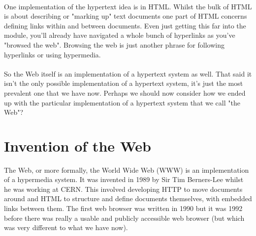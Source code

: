 \documentclass[12pt, a4paper, oneside]{book}
\begin{document}
\paragraph{} One implementation of the hypertext idea is in HTML.  Whilst the bulk of HTML is about describing or "marking up" text documents one part of HTML concerns defining links within and between documents. Even just getting this far into the module, you'll already have navigated a whole bunch of hyperlinks as you've "browsed the web". Browsing the web is just another phrase for following hyperlinks or using hypermedia. 
\paragraph{} So the Web itself is an implementation of a hypertext system as well. That said it isn't the only possible implementation of a hypertext system, it's just the most prevalent one that we have now. Perhaps we should now consider how we ended up with the particular implementation of a hypertext system that we call "the Web"?


\section{Invention of the Web}
\paragraph{} The Web, or more formally, the World Wide Web (WWW) is an implementation of a hypermedia system. It was invented in 1989 by Sir Tim Berners-Lee whilst he was working at CERN. This involved developing HTTP to move documents around and HTML to structure and define documents themselves, with embedded links between them. The first web browser was written in 1990 but it was 1992 before there was really a usable and publicly accessible web browser (but which was very different to what we have now).
\end{document}
